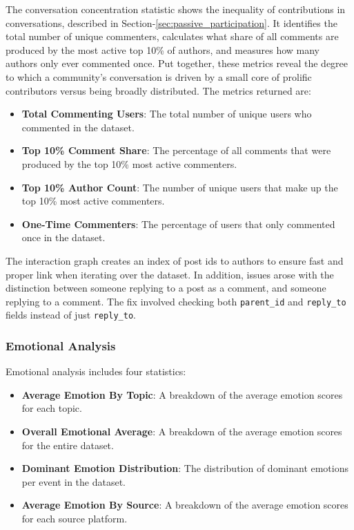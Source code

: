 \documentclass[12pt, a4paper]{article}
\begin{document}
The conversation concentration statistic shows the inequality of contributions in conversations, described in Section-\ref{sec:passive_participation}. It identifies the total number of unique commenters, calculates what share of all comments are produced by the most active top 10\% of authors, and measures how many authors only ever commented once. Put together, these metrics reveal the degree to which a community's conversation is driven by a small core of prolific contributors versus being broadly distributed. The metrics returned are:
\begin{itemize}
    \item \textbf{Total Commenting Users}: The total number of unique users who commented in the dataset.
    \item \textbf{Top 10\% Comment Share}: The percentage of all comments that were produced by the top 10\% most active commenters.
    \item \textbf{Top 10\% Author Count}: The number of unique users that make up the top 10\% most active commenters.
    \item \textbf{One-Time Commenters}: The percentage of users that only commented once in the dataset.
\end{itemize}

The interaction graph creates an index of post ids to authors to ensure fast and proper link when iterating over the dataset. In addition, issues arose with the distinction between someone replying to a post as a comment, and someone replying to a comment. The fix involved checking both \texttt{parent\_id} and \texttt{reply\_to} fields instead of just \texttt{reply\_to}.

\subsubsection{Emotional Analysis}
Emotional analysis includes four statistics:
\begin{itemize}
    \item \textbf{Average Emotion By Topic}: A breakdown of the average emotion scores for each topic.
    \item \textbf{Overall Emotional Average}: A breakdown of the average emotion scores for the entire dataset.
    \item \textbf{Dominant Emotion Distribution}: The distribution of dominant emotions per event in the dataset.
    \item \textbf{Average Emotion By Source}: A breakdown of the average emotion scores for each source platform.
\end{itemize}
\end{document}
